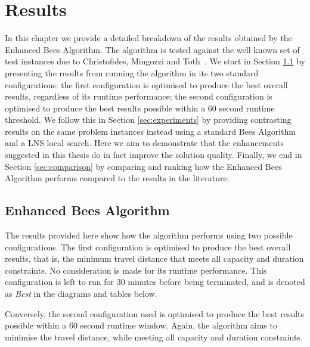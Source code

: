 
\chapter{Results}
\label{chap:results}

In this chapter we provide a detailed breakdown of the results obtained by the Enhanced Bees Algorithm. The algorithm is tested against the well known set of test instances due to Christofides, Mingozzi and Toth~\cite{CMT:1981}. We start in Section \ref{sec:standardresults} by presenting the results from running the algorithm in its two standard configurations: the first configuration is optimised to produce the best overall results, regardless of its runtime performance; the second configuration is optimised to produce the best results possible within a 60 second runtime threshold. We follow this in Section \ref{sec:experiments} by providing contrasting results on the same problem instances instead using a standard Bees Algorithm and a LNS local search. Here we aim to demonstrate that the enhancements suggested in this thesis do in fact improve the solution quality. Finally, we end in Section \ref{sec:comparison} by comparing and ranking how the Enhanced Bees Algorithm performs compared to the results in the literature. 

\section{Enhanced Bees Algorithm}
\label{sec:standardresults}

The results provided here show how the algorithm performs using two possible configurations. The first configuration is optimised to produce the best overall results, that is, the minimum travel distance that meets all capacity and duration constraints. No consideration is made for its runtime performance. This configuration is left to run for 30 minutes before being terminated, and is denoted as \emph{Best} in the diagrams and tables below.

Conversely, the second configuration used is optimised to produce the best results possible within a 60 second runtime window. Again, the algorithm aims to minimise the travel distance, while meeting all capacity and duration constraints.



